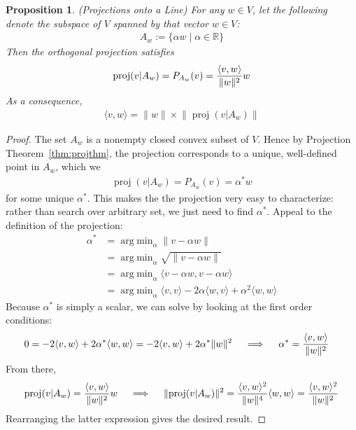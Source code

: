 \documentclass[12pt]{book}
\numberwithin{equation}{section} %
\theoremstyle{plain}
\newtheorem{prop}[thm]{Proposition}
\theoremstyle{definition}
\theoremstyle{remark}
\newcommand{\proj}{\operatorname{proj}}
\newcommand{\R}{\mathbb{R}}
\DeclareMathOperator*{\argmin}{arg\;min}
\begin{document}
\begin{prop}
\label{prop:projline}
\emph{(Projections onto a Line)}
For any $w\in V$, let the following denote the subspace of $V$ spanned
by that vector $w\in V$:
\begin{align*}
  A_w:=\{\alpha w\;|\; \alpha\in \R\}
\end{align*}
Then the orthogonal projection satisfies
\begin{align*}
  \proj(v|A_w)
  =
  P_{A_w}(v)
  =
  \frac{%
    \langle
    v,w
    \rangle
  }{%
    \lVert w\rVert^2
  }
  w
\end{align*}
As a consequence,
\begin{align*}
  \langle
  v,w
  \rangle
  =
  \lVert w\rVert
  \times
  \lVert\proj(v|A_w)\rVert
\end{align*}
\end{prop}
\begin{proof}
The set $A_w$ is a nonempty closed convex subset of $V$.
Hence by Projection Theorem~\ref{thm:projthm},
the projection corresponds to a unique, well-defined point in $A_w$,
which we
\begin{align*}
  \proj(v|A_w) = P_{A_w}(v) = \alpha^* w
\end{align*}
for some unique $\alpha^*$.
This makes the the projection very easy to characterize: rather than
search over arbitrary set, we just need to find $\alpha^*$.
Appeal to the definition of the projection:
\begin{align*}
  \alpha^*
  &= \argmin_{\alpha}  \lVert v - \alpha w\rVert
  \\
  &= \argmin_{\alpha}  \sqrt{\lVert v - \alpha w\rVert}
  \\
  &= \argmin_{\alpha}  \langle v - \alpha w, v - \alpha w\rangle
  \\
  &= \argmin_{\alpha}
  \langle v, v\rangle
  -
  2
  \alpha
  \langle w, v\rangle
  +
  \alpha^2
  \langle w, w\rangle
\end{align*}
Because $\alpha^*$ is simply a scalar, we can solve by looking at the
first order conditions:
\begin{align*}
  0
  &=
  -2\langle v,w\rangle
  + 2\alpha^*\langle w,w\rangle
  =
  -2\langle v,w\rangle
  + 2\alpha^* \lVert w\rVert^2
  \quad\implies\quad
  \alpha^*
  =
  \frac{%
    \langle v,w\rangle
  }{%
    \lVert w\rVert^2
  }
\end{align*}
From there,
\begin{align*}
  \proj(v|A_w)
  =
  \frac{%
    \langle v,w\rangle
  }{%
    \lVert w\rVert^2
  }
  w
  \quad\implies\quad
  \lVert \proj(v|A_w)\rVert^2
  =
  \frac{%
    \langle v,w\rangle^2
  }{%
    \lVert w\rVert^4
  }
  \langle w,w\rangle
  =
  \frac{%
    \langle v,w\rangle^2
  }{%
    \lVert w\rVert^2
  }
\end{align*}
Rearranging the latter expression gives the desired result.
\end{proof}
\end{document}
